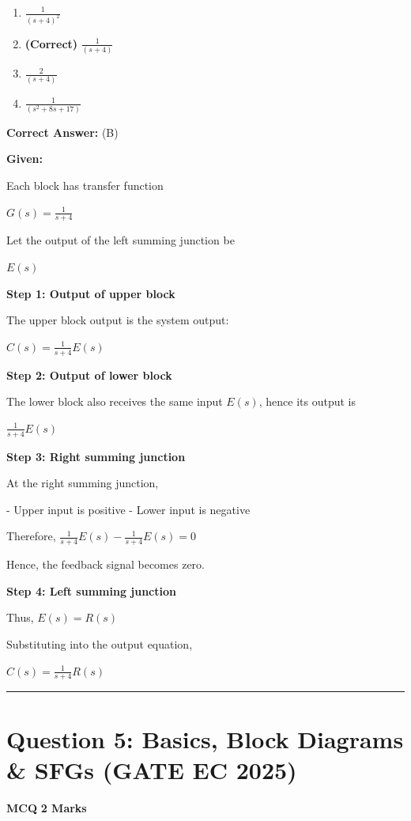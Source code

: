 \documentclass[11pt,a4paper]{article}
\begin{document}
\begin{enumerate}[label=(\Alph*)]
    \item $\frac{1}{(s+4)^2}$
    \item \textbf{(Correct)} $\frac{1}{(s+4)}$
    \item $\frac{2}{(s+4)}$
    \item $\frac{1}{(s^2+8s+17)}$
\end{enumerate}

\noindent \textbf{Correct Answer:} (B)

\begin{tcolorbox}[solbox, title=Detailed Solution -- Question 4]
\textbf{Given:}

Each block has transfer function

$G(s)=\frac{1}{s+4}$

Let the output of the left summing junction be

$E(s)$

\textbf{Step 1: Output of upper block}

The upper block output is the system output:

$C(s)=\frac{1}{s+4}E(s)$

\textbf{Step 2: Output of lower block}

The lower block also receives the same input $E(s)$, hence its output is

$\frac{1}{s+4}E(s)$

\textbf{Step 3: Right summing junction}

At the right summing junction,

- Upper input is positive
- Lower input is negative

Therefore, $\frac{1}{s+4}E(s)-\frac{1}{s+4}E(s)=0$

Hence, the feedback signal becomes zero.

\textbf{Step 4: Left summing junction}

Thus,
$E(s)=R(s)$

Substituting into the output equation,

$C(s)=\frac{1}{s+4}R(s)$
\end{tcolorbox}

\vspace{1.5em}
\hrule
\vspace{1.5em}

\section*{Question 5: Basics, Block Diagrams \& SFGs (GATE EC 2025)}
\noindent \textbf{\color{primary}MCQ} \hfill \textbf{\color{secondary}2 Marks}
\end{document}
